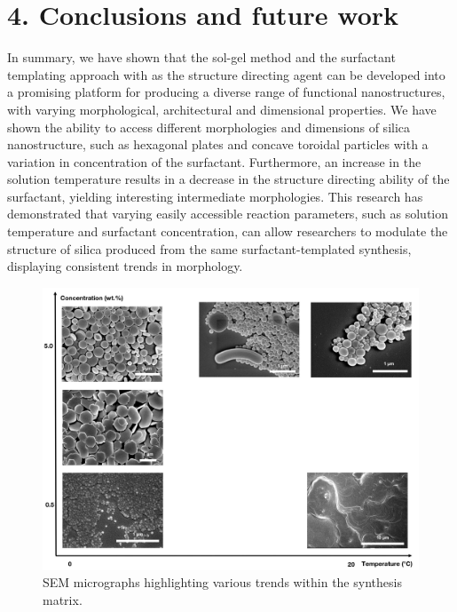 \documentclass[a4paper,12pt,twocolumn]{article}
\begin{document}
	 \section{4. Conclusions and future work}
	 
	 In summary, we have shown that the sol-gel method and the surfactant templating approach with  as the structure directing agent can be developed into a promising platform for producing a diverse range of functional nanostructures, with varying morphological, architectural and dimensional properties. We have shown the ability to access different morphologies and dimensions of silica nanostructure, such as hexagonal plates and concave toroidal particles with a variation in concentration of the  surfactant. Furthermore, an increase in the solution temperature results in a decrease in the structure directing ability of the surfactant, yielding interesting intermediate morphologies. This research has demonstrated that varying easily accessible reaction parameters, such as solution temperature and surfactant concentration, can allow researchers to modulate the structure of silica produced from the same surfactant-templated synthesis, displaying consistent trends in morphology. 
	 
	 	\begin{figure}[!b]
  	 	\centering
		\includegraphics[width=\linewidth]{trends.jpg}
  		\caption{SEM micrographs highlighting various trends within the synthesis matrix.}
  	\end{figure}
	 
\end{document}

